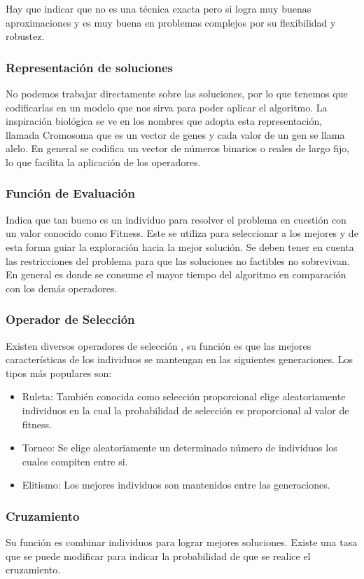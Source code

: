 Hay que indicar que no es una técnica exacta pero si logra muy buenas aproximaciones y es muy buena en problemas complejos por su flexibilidad y robustez. 


\subsubsection{Representación de soluciones}
No podemos trabajar directamente sobre las soluciones, por lo que tenemos que codificarlas en un modelo que nos sirva para poder aplicar el algoritmo.
La inspiración biológica se ve en los nombres que adopta esta representación, llamada Cromosoma que es un vector de genes y cada valor de un gen se llama alelo.
En general se codifica un vector de números binarios o reales de largo fijo, lo que facilita la aplicación de los operadores.

\subsubsection{Función de Evaluación} 
Indica que tan bueno es un individuo para resolver el problema en cuestión con un valor conocido como Fitness. Este se utiliza para seleccionar a los mejores y de esta forma guiar la exploración hacia la mejor solución.
Se deben tener en cuenta las restricciones del problema para que las soluciones no factibles no sobrevivan.
En general es donde se consume el mayor tiempo del algoritmo en comparación con los demás operadores.

\subsubsection{Operador de Selección}
Existen diversos operadores de selección , su función es que las mejores características de los individuos se mantengan en las siguientes generaciones.
Los tipos más populares son:

\begin{itemize}
	\item Ruleta: También conocida como selección proporcional elige aleatoriamente individuos en la cual la probabilidad de selección es proporcional al valor de fitness.
	\item Torneo: Se elige aleatoriamente un determinado número de individuos los cuales compiten entre si.
	\item Elitismo: Los mejores individuos son mantenidos entre las generaciones.
\end{itemize}

\subsubsection{Cruzamiento}
Su función es combinar individuos para lograr mejores soluciones. 
Existe una tasa que se puede modificar para indicar la probabilidad de que se realice el cruzamiento.

